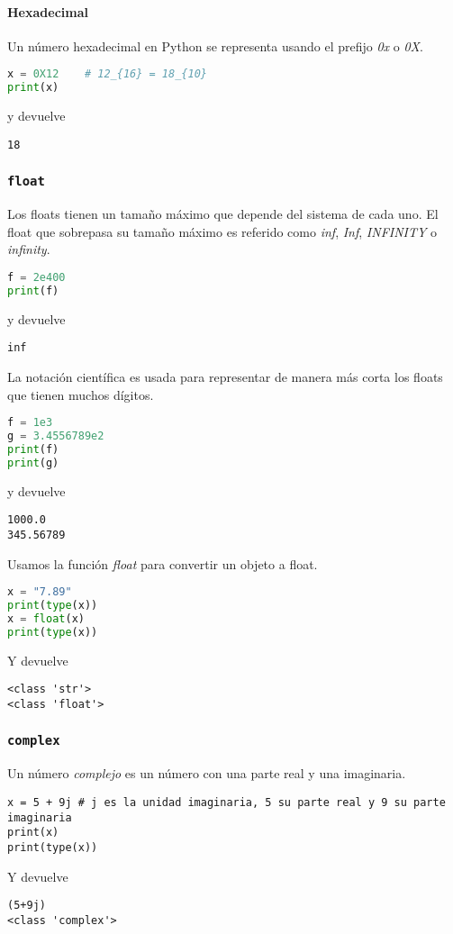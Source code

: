     \paragraph{Hexadecimal} Un número hexadecimal en Python se representa usando el prefijo \emph{0x} o \emph{0X}.
    \begin{lstlisting}[language={python}]
x = 0X12    # 12_{16} = 18_{10}
print(x)
    \end{lstlisting}
    y devuelve
    \begin{lstlisting}[language={[latex]tex}]
18
    \end{lstlisting}
    \subsubsection{\texttt{float}}\label{subsubsec: float}
    Los floats tienen un tamaño máximo que depende del sistema de cada uno. El float que sobrepasa su tamaño máximo es referido como \emph{inf}, \emph{Inf}, \emph{INFINITY} o \emph{infinity}. 
    \begin{lstlisting}[language={python}]
f = 2e400
print(f)
    \end{lstlisting}
    y devuelve
    \begin{lstlisting}[language={[latex]tex}]
inf
    \end{lstlisting}
    La notación científica es usada para representar de manera más corta los floats que tienen muchos dígitos.
    \begin{lstlisting}[language={python}]
f = 1e3
g = 3.4556789e2
print(f)
print(g)
    \end{lstlisting}
    y devuelve
    \begin{lstlisting}[language={[latex]tex}]
1000.0
345.56789
    \end{lstlisting}
    Usamos la función \emph{float} para convertir un objeto a float.
    \begin{lstlisting}[language = {python}]
x = "7.89"
print(type(x))
x = float(x)
print(type(x))
    \end{lstlisting}
    Y devuelve 
    \begin{lstlisting}[language = {[latex]tex}]
<class 'str'>
<class 'float'>
    \end{lstlisting}
    \subsubsection{\texttt{complex}}\label{subsubsec: complex}
    Un número \emph{complejo} es un número con una parte real y una imaginaria.
    \begin{lstlisting}
x = 5 + 9j # j es la unidad imaginaria, 5 su parte real y 9 su parte imaginaria
print(x)
print(type(x))
    \end{lstlisting}
    Y devuelve
    \begin{lstlisting}[language = {[latex]tex}]
(5+9j)
<class 'complex'>
    \end{lstlisting}
